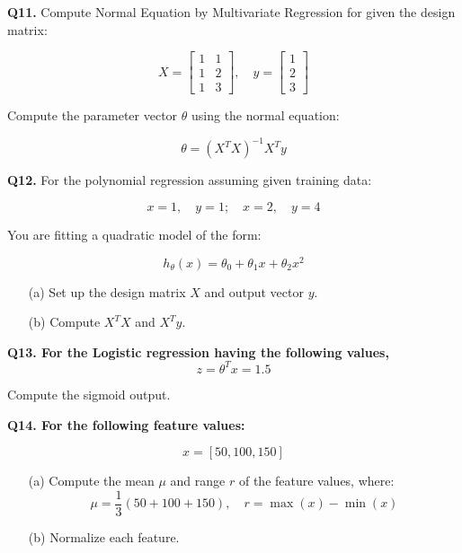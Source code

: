 \documentclass{article}
\begin{document}
\vspace{1\baselineskip}

\textbf{Q11.} Compute Normal Equation by Multivariate Regression for given the design matrix:

\[
X = 
\begin{bmatrix}
1 & 1 \\
1 & 2 \\
1 & 3
\end{bmatrix},
\quad
y = 
\begin{bmatrix}
1 \\
2 \\
3
\end{bmatrix}
\]

Compute the parameter vector \( \theta \) using the normal equation:

\[
\theta = (X^T X)^{-1} X^T y
\]

\vspace{1\baselineskip}


\textbf{Q12.}  For the polynomial regression assuming given training data:

\[
x = 1, \quad y = 1; \quad x = 2, \quad y = 4
\]

You are fitting a quadratic model of the form:

\[
h_\theta(x) = \theta_0 + \theta_1 x + \theta_2 x^2
\]

\begin{itemize}
    \item[(a)] Set up the design matrix \( X \) and output vector \( y \).
    \item[(b)] Compute \( X^T X \) and \( X^T y \).
\end{itemize}
\vspace{1\baselineskip}

\textbf{Q13. For the Logistic regression having the following values,}
\[
z = \theta^T x = 1.5
\]

Compute the sigmoid output.
\vspace{1\baselineskip}


\textbf{Q14. For the following feature values:}

\[
x = [50, 100, 150]
\]

\begin{itemize}
    \item[(a)] Compute the mean \( \mu \) and range \( r \) of the feature values, where:
    \[
    \mu = \frac{1}{3}(50 + 100 + 150), \quad r = \max(x) - \min(x)
    \]

    \item[(b)] Normalize each feature.
\end{itemize}
\end{document}
